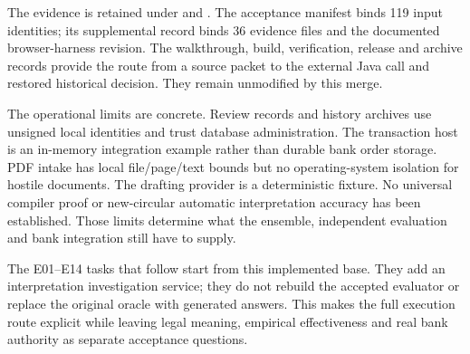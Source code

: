 The evidence is retained under  and
. The acceptance manifest binds 119 input
identities; its supplemental record binds 36 evidence files and the documented
browser-harness revision. The walkthrough, build, verification, release and
archive records provide the route from a source packet to the external Java
call and restored historical decision. They remain unmodified by this merge.


The operational limits are concrete. Review records and history archives use
unsigned local identities and trust database administration. The transaction
host is an in-memory integration example rather than durable bank order
storage. PDF intake has local file/page/text bounds but no operating-system
isolation for hostile documents. The drafting provider is a deterministic
fixture. No universal compiler proof or new-circular automatic interpretation
accuracy has been established. Those limits determine what the ensemble,
independent evaluation and bank integration still have to supply.

The E01--E14 tasks that follow start from this implemented base. They add an
interpretation investigation service; they do not rebuild the accepted evaluator
or replace the original oracle with generated answers. This makes the full
execution route explicit while leaving legal meaning, empirical effectiveness
and real bank authority as separate acceptance questions.

